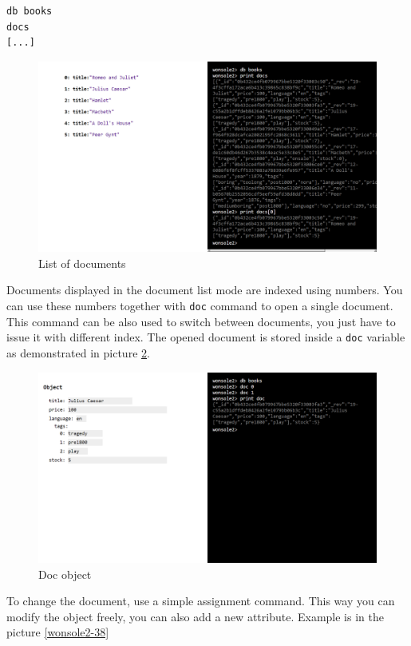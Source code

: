 \documentclass[10pt,a4paper,oneside]{report}
\begin{document}
\begin{verbatim}
db books
docs
[...]
\end{verbatim}
 

\begin{figure}
\centering
\includegraphics[width=\textwidth]{screenshot/wonsole2/wonsole2-26.png}
\caption{List of documents}
\label{wonsole2-26}
\end{figure}

Documents displayed in the document list mode are indexed using numbers. You can
use these numbers together with \verb|doc| command to open a single document.
This command can be also used to switch between documents, you just have to
issue it with different index. The opened document is stored inside a \verb|doc|
variable as demonstrated in picture \ref{wonsole2-32}.

\begin{figure}
\centering
\includegraphics[width=\textwidth]{screenshot/wonsole2/wonsole2-32.png}
\caption{Doc object}
\label{wonsole2-32}
\end{figure}

To change the document, use a simple assignment command. This way you can modify
the object freely, you can also add a new attribute. Example is in the picture
\ref{wonsole2-38}
\end{document}
